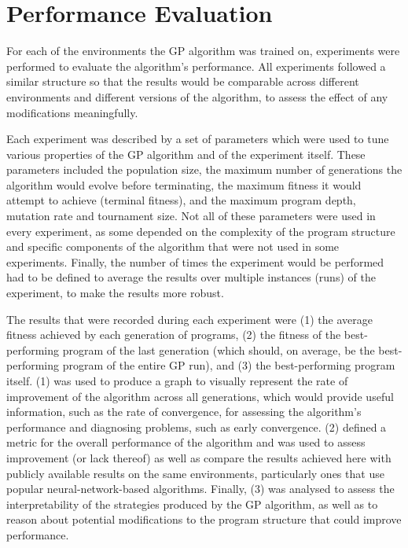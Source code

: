 \section{Performance Evaluation}
For each of the environments the GP algorithm was trained on, experiments were performed to evaluate the algorithm's performance. All experiments followed a similar structure so that the results would be comparable across different environments and different versions of the algorithm, to assess the effect of any modifications meaningfully. 

Each experiment was described by a set of parameters which were used to tune various properties of the GP algorithm and of the experiment itself. These parameters included the population size, the maximum number of generations the algorithm would evolve before terminating, the maximum fitness it would attempt to achieve (terminal fitness), and the maximum program depth, mutation rate and tournament size. Not all of these parameters were used in every experiment, as some depended on the complexity of the program structure and specific components of the algorithm that were not used in some experiments. Finally, the number of times the experiment would be performed had to be defined to average the results over multiple instances (runs) of the experiment, to make the results more robust.

The results that were recorded during each experiment were (1) the average fitness achieved by each generation of programs, (2) the fitness of the best-performing program of the last generation (which should, on average, be the best-performing program of the entire GP run), and (3) the best-performing program itself. (1) was used to produce a graph to visually represent the rate of improvement of the algorithm across all generations, which would provide useful information, such as the rate of convergence, for assessing the algorithm's performance and diagnosing problems, such as early convergence. (2) defined a metric for the overall performance of the algorithm and was used to assess improvement (or lack thereof) as well as compare the results achieved here with publicly available results on the same environments, particularly ones that use popular neural-network-based algorithms. Finally, (3) was analysed to assess the interpretability of the strategies produced by the GP algorithm, as well as to reason about potential modifications to the program structure that could improve performance.
